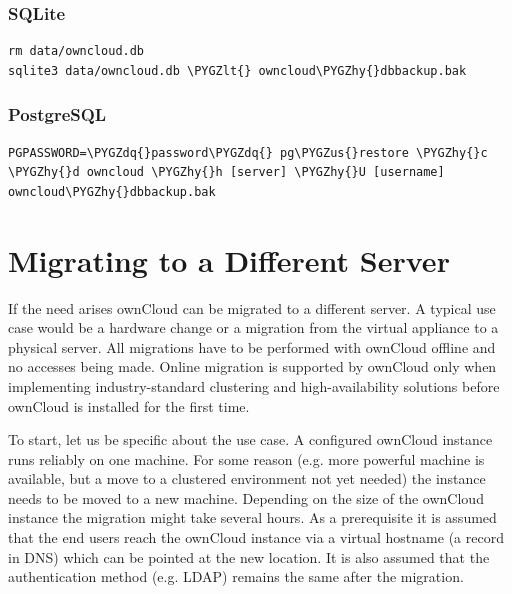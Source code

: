 \documentclass[letterpaper,10pt,english]{sphinxmanual}
\def\PYGZus{\char`\_}
\def\PYGZlt{\char`\<}
\def\PYGZhy{\char`\-}
\def\PYGZdq{\char`\"}
\begin{document}
\subsubsection{SQLite}
\label{maintenance/restore:sqlite}
\begin{Verbatim}[commandchars=\\\{\}]
rm data/owncloud.db
sqlite3 data/owncloud.db \PYGZlt{} owncloud\PYGZhy{}dbbackup.bak
\end{Verbatim}


\subsubsection{PostgreSQL}
\label{maintenance/restore:postgresql}
\begin{Verbatim}[commandchars=\\\{\}]
PGPASSWORD=\PYGZdq{}password\PYGZdq{} pg\PYGZus{}restore \PYGZhy{}c \PYGZhy{}d owncloud \PYGZhy{}h [server] \PYGZhy{}U [username]
owncloud\PYGZhy{}dbbackup.bak
\end{Verbatim}


\section{Migrating to a Different Server}
\label{maintenance/migrating:migrating-to-a-different-server}\label{maintenance/migrating::doc}
If the need arises ownCloud can be migrated to a different server. A typical use case would be a hardware change or a migration from the virtual appliance to a physical server. All migrations have to be performed with ownCloud offline and no accesses being made. Online migration is supported by ownCloud only when implementing industry-standard clustering and high-availability solutions before ownCloud is installed for the first time.

To start, let us be specific about the use case. A configured ownCloud instance runs reliably on one machine. For some reason (e.g. more powerful machine is available, but a move to a clustered environment not yet needed) the instance needs to be moved to a new machine. Depending on the size of the ownCloud instance the migration might take several hours. As a prerequisite it is assumed that the end users reach the ownCloud instance via a virtual hostname (a  record in DNS) which can be pointed at the new location. It is also assumed that the authentication method (e.g. LDAP) remains the same after the migration.
\end{document}
